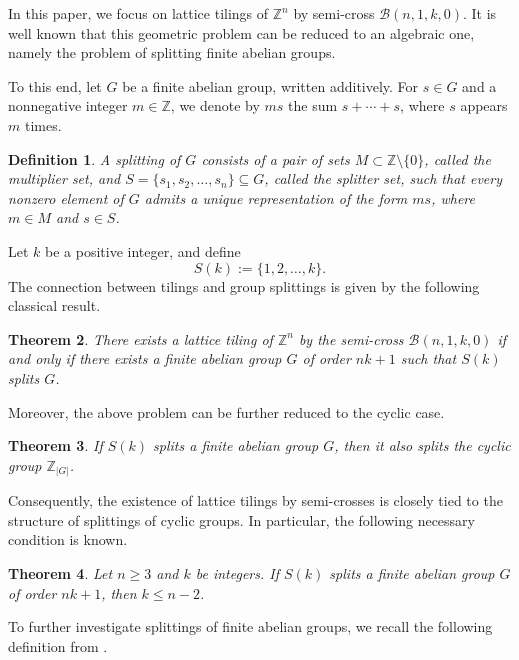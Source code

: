 \documentclass[12pt]{article}
\newtheorem{theorem}{Theorem}[section]
\newtheorem{definition}[theorem]{Definition}
\begin{document}
In this paper, we focus on lattice tilings of $\mathbb{Z}^n$ by semi-cross $\mathcal{B}(n,1,k,0)$. It is well known that this geometric problem can be reduced to an algebraic one, namely the problem of splitting finite abelian groups.

To this end, let $G$ be a finite abelian group, written additively. For $s\in G$ and a nonnegative integer $m\in\mathbb{Z}$, we denote by $ms$ the sum $s+\cdots+s$, where $s$ appears $m$ times.

\begin{definition}
    A \emph{splitting} of $G$ consists of a pair of sets $M\subset\mathbb{Z}\setminus\{0\}$, called the \emph{multiplier set}, and $S=\{s_1,s_2,\dots,s_n\}\subseteq G$, called the \emph{splitter set}, such that every nonzero element of $G$ admits a unique representation of the form $ms$, where $m\in M$ and $s\in S$.
\end{definition}

Let $k$ be a positive integer, and define
\[S(k):=\{1,2,\dots,k\}.\]
The connection between tilings and group splittings is given by the following classical result.

\begin{theorem}\cite{HS1986,SS1994}
There exists a lattice tiling of $\mathbb{Z}^n$ by the semi-cross $\mathcal{B}(n,1,k,0)$ if and only if there exists a finite abelian group $G$ of order $nk+1$ such that $S(k)$ splits $G$.
\end{theorem}

Moreover, the above problem can be further reduced to the cyclic case.

\begin{theorem}\cite{H1983,SS1994}
If $S(k)$ splits a finite abelian group $G$, then it also splits the cyclic group $\mathbb{Z}_{|G|}$.
\end{theorem}

Consequently, the existence of lattice tilings by semi-crosses is closely tied to the structure of splittings of cyclic groups. In particular, the following necessary condition is known.

\begin{theorem}\cite[Chapter 4, Theorem 3]{SS1994}\label{thm2}
Let $n\ge3$ and $k$ be integers. If $S(k)$ splits a finite abelian group $G$ of order $nk+1$, then $k\le n-2$.
\end{theorem}

To further investigate splittings of finite abelian groups, we recall the following definition from \cite{SS1994}.
\end{document}
